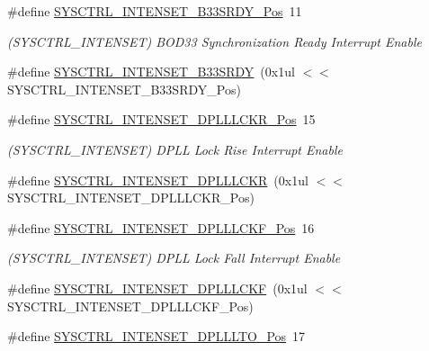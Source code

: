 \begin{DoxyCompactItemize}
\item 
\#define \mbox{\hyperlink{group___s_a_m_d21___s_y_s_c_t_r_l_ga52f6b26c6428954518c358368901ed8a}{S\+Y\+S\+C\+T\+R\+L\+\_\+\+I\+N\+T\+E\+N\+S\+E\+T\+\_\+\+B33\+S\+R\+D\+Y\+\_\+\+Pos}}~11
\begin{DoxyCompactList}\small\item\em (S\+Y\+S\+C\+T\+R\+L\+\_\+\+I\+N\+T\+E\+N\+S\+ET) B\+O\+D33 Synchronization Ready Interrupt Enable \end{DoxyCompactList}\item 
\#define \mbox{\hyperlink{group___s_a_m_d21___s_y_s_c_t_r_l_ga6d83a4e02bbf89d701dd15a9ecca567e}{S\+Y\+S\+C\+T\+R\+L\+\_\+\+I\+N\+T\+E\+N\+S\+E\+T\+\_\+\+B33\+S\+R\+DY}}~(0x1ul $<$$<$ S\+Y\+S\+C\+T\+R\+L\+\_\+\+I\+N\+T\+E\+N\+S\+E\+T\+\_\+\+B33\+S\+R\+D\+Y\+\_\+\+Pos)
\item 
\#define \mbox{\hyperlink{group___s_a_m_d21___s_y_s_c_t_r_l_ga03bea43527ec9248d8969437a7fccb9c}{S\+Y\+S\+C\+T\+R\+L\+\_\+\+I\+N\+T\+E\+N\+S\+E\+T\+\_\+\+D\+P\+L\+L\+L\+C\+K\+R\+\_\+\+Pos}}~15
\begin{DoxyCompactList}\small\item\em (S\+Y\+S\+C\+T\+R\+L\+\_\+\+I\+N\+T\+E\+N\+S\+ET) D\+P\+LL Lock Rise Interrupt Enable \end{DoxyCompactList}\item 
\#define \mbox{\hyperlink{group___s_a_m_d21___s_y_s_c_t_r_l_gaf675e3b32aa39a43d94f27e07c41031d}{S\+Y\+S\+C\+T\+R\+L\+\_\+\+I\+N\+T\+E\+N\+S\+E\+T\+\_\+\+D\+P\+L\+L\+L\+C\+KR}}~(0x1ul $<$$<$ S\+Y\+S\+C\+T\+R\+L\+\_\+\+I\+N\+T\+E\+N\+S\+E\+T\+\_\+\+D\+P\+L\+L\+L\+C\+K\+R\+\_\+\+Pos)
\item 
\#define \mbox{\hyperlink{group___s_a_m_d21___s_y_s_c_t_r_l_ga7b5c3ff4d31a203a8ffb43984827c1c8}{S\+Y\+S\+C\+T\+R\+L\+\_\+\+I\+N\+T\+E\+N\+S\+E\+T\+\_\+\+D\+P\+L\+L\+L\+C\+K\+F\+\_\+\+Pos}}~16
\begin{DoxyCompactList}\small\item\em (S\+Y\+S\+C\+T\+R\+L\+\_\+\+I\+N\+T\+E\+N\+S\+ET) D\+P\+LL Lock Fall Interrupt Enable \end{DoxyCompactList}\item 
\#define \mbox{\hyperlink{group___s_a_m_d21___s_y_s_c_t_r_l_ga45a3cc7328f645b6db389f3cedf0406f}{S\+Y\+S\+C\+T\+R\+L\+\_\+\+I\+N\+T\+E\+N\+S\+E\+T\+\_\+\+D\+P\+L\+L\+L\+C\+KF}}~(0x1ul $<$$<$ S\+Y\+S\+C\+T\+R\+L\+\_\+\+I\+N\+T\+E\+N\+S\+E\+T\+\_\+\+D\+P\+L\+L\+L\+C\+K\+F\+\_\+\+Pos)
\item 
\#define \mbox{\hyperlink{group___s_a_m_d21___s_y_s_c_t_r_l_ga4b551a7062e06cc7732d07d4848f8aec}{S\+Y\+S\+C\+T\+R\+L\+\_\+\+I\+N\+T\+E\+N\+S\+E\+T\+\_\+\+D\+P\+L\+L\+L\+T\+O\+\_\+\+Pos}}~17
$$
\end{DoxyCompactItemize}
